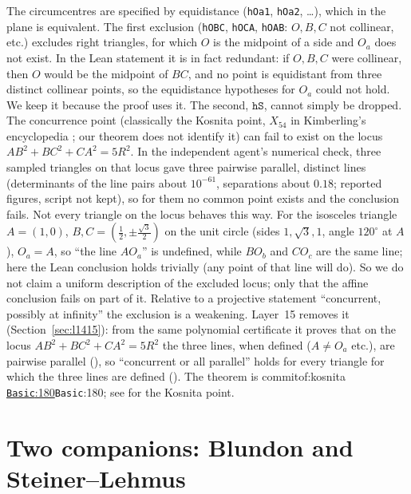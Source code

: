 \documentclass[11pt]{article}
\theoremstyle{definition}
\theoremstyle{remark}
\newcommand{\lean}[1]{\texttt{#1}}
\newcommand{\commitof}[1]{\csname commitof:#1\endcsname}
\newcommand{\repo}[1]{https://github.com/jpbald93/#1}
\newcommand{\src}[4]{\ifcsname commitof:#1\endcsname
  \href{\repo{#1}/blob/\commitof{#1}/#2/#3.lean\#L#4}{\texttt{#3}:#4}\else\texttt{#3}:#4\fi}
\begin{document}
The circumcentres are specified by equidistance (\lean{hOa1}, \lean{hOa2}, \ldots), which in the
plane is equivalent. The first exclusion (\lean{hOBC}, \lean{hOCA}, \lean{hOAB}: $O,B,C$ not collinear, etc.) excludes
right triangles, for which $O$ is the midpoint of a side and $O_a$ does not exist. In the Lean
statement it is in fact redundant: if $O,B,C$ were collinear, then $O$ would be the midpoint of $BC$, and
no point is equidistant from three distinct collinear points, so the equidistance hypotheses for $O_a$
could not hold. We keep it because the proof uses it. The second, $\lean{hS}$, cannot simply be
dropped. The concurrence point (classically the Kosnita point, $X_{54}$ in Kimberling's encyclopedia
\cite{etc}; our theorem does not identify it) can fail to exist on the locus $AB^2+BC^2+CA^2=5R^2$.
In the independent agent's numerical check, three sampled triangles on that locus
gave three pairwise parallel, distinct lines (determinants of the line pairs about $10^{-61}$,
separations about $0.18$; reported figures, script not kept), so for them no common point exists and
the conclusion fails. Not every triangle on the locus behaves this way. For the isosceles triangle $A=(1,0)$, $B,C=(\tfrac12,\pm\tfrac{\sqrt3}2)$ on the unit circle
(sides $1,\sqrt3,1$, angle $120^\circ$ at $A$), $O_a=A$, so ``the line $AO_a$'' is undefined, while $BO_b$ and $CO_c$ are the same line; here the Lean conclusion holds trivially (any point
of that line will do). So we do not claim a uniform description of the excluded locus; only that the
affine conclusion fails on part of it. Relative to a projective statement ``concurrent, possibly at infinity'' the exclusion is a
weakening. Layer~15 removes it (Section~\ref{sec:l1415}): from the same polynomial certificate it proves
that on the locus $AB^2+BC^2+CA^2=5R^2$ the three lines, when defined ($A\neq O_a$ etc.), are pairwise
parallel (), so ``concurrent or all parallel'' holds for
every triangle for which the three lines are defined (). The
theorem is \src{kosnita}{Kosnita}{Basic}{180}; see \cite{grinberg2003} for the Kosnita point.

\section{Two companions: Blundon and Steiner--Lehmus}\label{sec:companions}
\end{document}
